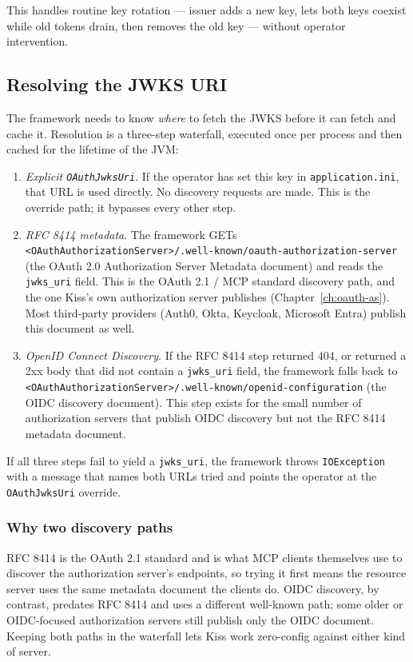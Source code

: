 This handles routine key rotation --- issuer adds a new key, lets both keys coexist while old tokens drain, then removes the old key --- without operator intervention.

\subsection{Resolving the JWKS URI}
\label{sec:oauth-jwks-discovery}

The framework needs to know \emph{where} to fetch the JWKS before it can fetch and cache it.  Resolution is a three-step waterfall, executed once per process and then cached for the lifetime of the JVM:

\begin{enumerate}
  \item \emph{Explicit \texttt{OAuthJwksUri}}.  If the operator has set this key in \texttt{application.ini}, that URL is used directly.  No discovery requests are made.  This is the override path; it bypasses every other step.
  \item \emph{RFC 8414 metadata}.  The framework GETs \texttt{<OAuthAuthorization\-Server>/.well-known/oauth-authorization-server} (the OAuth 2.0 Authorization Server Metadata document) and reads the \texttt{jwks\_uri} field.  This is the OAuth 2.1 / MCP standard discovery path, and the one Kiss's own authorization server publishes (Chapter~\ref{ch:oauth-as}).  Most third-party providers (Auth0, Okta, Keycloak, Microsoft Entra) publish this document as well.
  \item \emph{OpenID Connect Discovery}.  If the RFC 8414 step returned 404, or returned a 2xx body that did not contain a \texttt{jwks\_uri} field, the framework falls back to \texttt{<OAuthAuthorization\-Server>/.well-known/openid-configuration} (the OIDC discovery document).  This step exists for the small number of authorization servers that publish OIDC discovery but not the RFC 8414 metadata document.
\end{enumerate}

If all three steps fail to yield a \texttt{jwks\_uri}, the framework throws \texttt{IOException} with a message that names both URLs tried and points the operator at the \texttt{OAuthJwksUri} override.

\subsubsection*{Why two discovery paths}

RFC 8414 is the OAuth 2.1 standard and is what MCP clients themselves use to discover the authorization server's endpoints, so trying it first means the resource server uses the same metadata document the clients do.  OIDC discovery, by contrast, predates RFC 8414 and uses a different well-known path; some older or OIDC-focused authorization servers still publish only the OIDC document.  Keeping both paths in the waterfall lets Kiss work zero-config against either kind of server.

